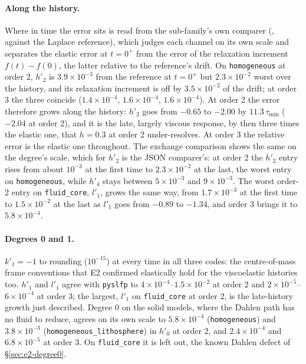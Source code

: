\documentclass[11pt]{article}
\numberwithin{equation}{section}
\newcommand{\code}[1]{\texttt{#1}}
\begin{document}
\paragraph{Along the history.} Where in time the error sits is read from
the sub-family's own comparer (, against
the Laplace reference), which judges each channel on its own scale and
separates the elastic error at $t=0^+$ from the error of the relaxation
increment $f(t)-f(0)$, the latter relative to the reference's drift. On
\code{homogeneous} at order 2, $h'_2$ is $3.9\times10^{-3}$ from the
reference at $t=0^+$ but $2.3\times10^{-2}$ worst over the history, and its
relaxation increment is off by $3.5\times10^{-2}$ of the drift; at order 3
the three coincide ($1.4\times10^{-4}$, $1.6\times10^{-4}$,
$1.6\times10^{-4}$). At order 2 the error therefore grows along the
history: $h'_2$ goes from $-0.65$ to $-2.00$ by $11.3\,\tau_{\min}$
($-2.04$ at order 2), and it is the late, largely viscous response, by then
three times the elastic one, that $h=0.3$ at order 2 under-resolves. At
order 3 the relative error is the elastic one throughout. The exchange
comparison shows the same on the degree's scale, which for $h'_2$ is the
JSON comparer's: at order 2 the $h'_2$ entry rises from about $10^{-3}$ at
the first time to $2.3\times10^{-2}$ at the last, the worst entry on
\code{homogeneous}, while $h'_4$ stays between $5\times10^{-3}$ and
$9\times10^{-3}$. The worst order-2 entry on \code{fluid\_core}, $l'_1$,
grows the same way, from $1.7\times10^{-3}$ at the first time to
$1.5\times10^{-2}$ at the last as $l'_1$ goes from $-0.89$ to $-1.34$, and
order 3 brings it to $5.8\times10^{-4}$.

\paragraph{Degrees 0 and 1.} $k'_1=-1$ to rounding ($10^{-15}$) at every
time in all three codes: the centre-of-mass frame conventions that E2
confirmed elastically hold for the viscoelastic histories too. $h'_1$ and
$l'_1$ agree with \code{pyslfp} to $4\times10^{-4}$--$1.5\times10^{-2}$ at
order 2 and $2\times10^{-5}$--$6\times10^{-4}$ at order 3; the largest,
$l'_1$ on \code{fluid\_core} at order 2, is the late-history growth just
described. Degree 0 on the solid models, where the Dahlen path has no fluid
to reduce, agrees on its own scale to $5.8\times10^{-4}$
(\code{homogeneous}) and $3.8\times10^{-3}$
(\code{homogeneous\_lithosphere}) in $h'_0$ at order 2, and
$2.4\times10^{-4}$ and $6.8\times10^{-5}$ at order 3. On \code{fluid\_core} it is left out, the
known Dahlen defect of \S\ref{sec:e2-degree0}.
\end{document}

